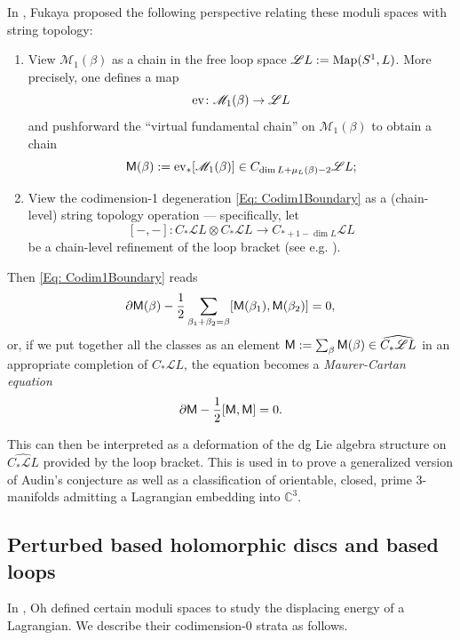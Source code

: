 \documentclass[10pt]{amsart}
\numberwithin{equation}{section}
\theoremstyle{plain}
\theoremstyle{definition}
\theoremstyle{remark}
\numberwithin{equation}{section}
\newcommand{\C}{\mathbb{C}}
\newcommand{\Map}{\textup{Map}}
\newcommand{\ev}{\textup{ev}}
\newcommand{\wh}[1]{\widehat{#1}}
\newcommand{\ms}[1]{\mathscr{#1}}
\newcommand{\MM}{\textup{\textsf{M}}}
\begin{document}
{In \cite{FukayaLagrangian}, Fukaya proposed the following perspective relating these moduli spaces with string topology:
\begin{enumerate}
	\item View $\ms{M}_{1}(\beta)$ as a chain in the free loop space $\ms{L}L := \Map(S^1, L)$. More precisely, one defines a map \[ \ev\colon \ms{M}_1(\beta)\to \ms{L}L \]and pushforward the ``virtual fundamental chain'' on $\ms{M}_1(\beta)$ to obtain a chain \[\MM(\beta):= \ev_* [\ms{M}_1(\beta)]\in C_{\dim L + \mu_L(\beta) -2}\ms{L}L;\]
	\item View the codimension-1 degeneration \eqref{Eq: Codim1Boundary} as a (chain-level) string topology operation --- specifically, let \[ [-,-]\colon C_*\ms{L}L \otimes C_*\ms{L}L \to C_{*+1-\dim L}\ms{L}L \] be a chain-level refinement of the loop bracket (see e.g. \cite{ChasSullivan}).
\end{enumerate}
Then \eqref{Eq: Codim1Boundary} reads \begin{align*}
		\partial \MM(\beta) - \frac{1}{2}\sum_{\beta_1+\beta_2=\beta}[\MM(\beta_1),\MM(\beta_2)] = 0 ,
	\end{align*}
	or, if we put together all the classes as an element $\MM:= \sum_\beta \MM(\beta) \in \wh{C_*\ms{L}L}$ in an appropriate completion of $C_*\ms{L}L$, the equation becomes a \emph{Maurer-Cartan equation} \begin{align*}
		\partial \MM - \frac{1}{2}[\MM,\MM] = 0.
	\end{align*}


This can then be interpreted as a deformation of the dg Lie algebra structure on $\wh{C_*\ms{L}L}$ provided by the loop bracket. This is used in \cite{FukayaLagrangian,Irie2} to prove a generalized version of Audin's conjecture as well as a classification of orientable, closed, prime 3-manifolds admitting a Lagrangian embedding into $\C^3$.

\subsection{Perturbed based holomorphic discs and based loops}\label{Subsc: PerturbedHolom}
In \cite{OhDisjEnergy}, Oh defined certain moduli spaces to study the displacing energy of a Lagrangian. 
We describe their codimension-0 strata as follows. 

}
\end{document}
